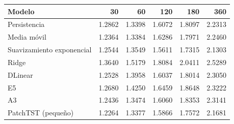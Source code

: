 \begin{tabular}{lrrrrr}
\toprule
Modelo & 30 & 60 & 120 & 180 & 360 \\
\midrule
Persistencia & 1.2862 & 1.3398 & 1.6072 & 1.8097 & 2.2313 \\
Media móvil & 1.2364 & 1.3384 & 1.6286 & 1.7971 & 2.2460 \\
Suavizamiento exponencial & 1.2544 & 1.3549 & 1.5611 & 1.7315 & 2.1303 \\
Ridge & 1.3640 & 1.5179 & 1.8084 & 2.0411 & 2.5289 \\
DLinear & 1.2528 & 1.3958 & 1.6037 & 1.8014 & 2.3050 \\
E5 & 1.2680 & 1.4250 & 1.6459 & 1.8648 & 2.3222 \\
A3 & 1.2436 & 1.3474 & 1.6060 & 1.8353 & 2.3141 \\
PatchTST (pequeño) & 1.2264 & 1.3377 & 1.5866 & 1.7572 & 2.1681 \\
\bottomrule
\end{tabular}
